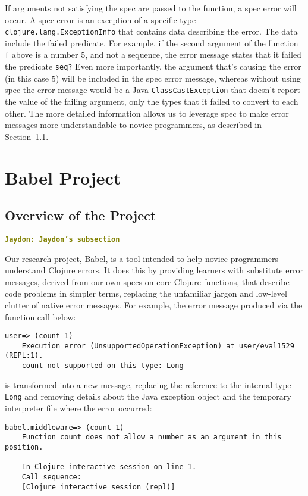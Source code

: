 \documentclass[12pt]{article}
\newcommand{\comment}[1]{{\bf \tt  {#1}}}
\newcommand{\jscomment}[1]{\textcolor{olive}{\comment{Jaydon: {#1}}}}
\begin{document}
If arguments not satisfying the spec are passed to the function, a spec error will occur. 
A spec error is an exception of a specific type \texttt{clojure.lang.ExceptionInfo} that contains data describing the error. 
The data include the failed predicate.
For example, if the second argument of the function 
\texttt{f} above is a number $5$, and not a sequence, the error message states that it failed the predicate \texttt{seq?}
Even more importantly, the argument that's causing the error (in this case $5$) will be included in the spec error message, whereas without using spec the error message would be a Java \texttt{ClassCastException} that doesn't report the value of the failing argument, only the types that it failed to convert to each other. 
The more detailed information allows us to leverage spec to make error messages more understandable to novice programmers, as described in Section~\ref{subsec:overview}. 

\section{Babel Project}\label{sec:babel}
\subsection{Overview of the Project}\label{subsec:overview}
\jscomment{Jaydon's subsection}

Our research project, Babel, is a tool intended to help novice programmers understand Clojure errors. It does this by providing learners with substitute error messages, derived from our own specs on core Clojure functions, that describe code problems in simpler terms, replacing the unfamiliar jargon and low-level clutter of native error messages. For example, the error message produced via the function call below:

\begin{lstlisting}[breaklines=true, basicstyle=\ttfamily]
    user=> (count 1)
    Execution error (UnsupportedOperationException) at user/eval1529 (REPL:1).
    count not supported on this type: Long
\end{lstlisting}
    
is transformed into a new message, replacing the reference to the internal type \verb|Long| and removing details about the Java exception object and the temporary interpreter file where the error occurred:

\begin{lstlisting}[breaklines=true, basicstyle=\ttfamily]
    babel.middleware=> (count 1)
    Function count does not allow a number as an argument in this position.

    In Clojure interactive session on line 1.
    Call sequence:
    [Clojure interactive session (repl)]
\end{lstlisting}
\end{document}
